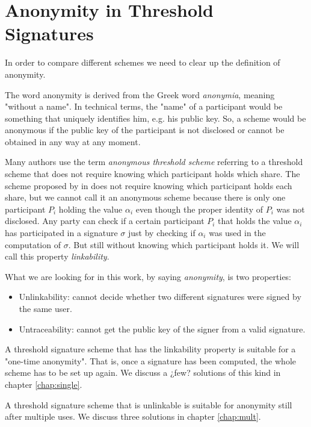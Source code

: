 \chapter{Anonymity in Threshold Signatures}
\label{chap:anon}
In order to compare different schemes we need to clear up the definition of anonymity.

The word anonymity is derived from the Greek word \textit{anonymia}, meaning "without a name". In technical terms, the "name" of a participant would be something that uniquely identifies him, e.g. his public key. So, a scheme would be anonymous if the public key of the participant is not disclosed or cannot be obtained in any way at any moment.

Many authors use the term \textit{anonymous threshold scheme} referring to a threshold scheme that does not require knowing which participant holds which share. The scheme proposed by \citeauthor{Boldyreva03} in \cite{Boldyreva03} does not require knowing which participant holds each share, but we cannot call it an anonymous scheme because there is only one participant $P_i$ holding the value $\alpha_i$ even though the proper identity of $P_i$ was not disclosed. Any party can check if a certain participant $P_i$ that holds the value $\alpha_i$ has participated in a signature $\sigma$ just by checking if $\alpha_i$ was used in the computation of $\sigma$. But still without knowing which participant holds it. We will call this property \textit{linkability}.

What we are looking for in this work, by saying \textit{anonymity}, is two properties:
\begin{itemize}
    \item Unlinkability: cannot decide whether two different signatures were signed by the same user.
    \item Untraceability: cannot get the public key of the signer from a valid signature.
\end{itemize}

A threshold signature scheme that has the linkability property is suitable for a "one-time anonymity". That is, once a signature has been computed, the whole scheme has to be set up again. We discuss a ¿few? solutions of this kind in chapter \ref{chap:single}.

A threshold signature scheme that is unlinkable is suitable for anonymity still after multiple uses. We discuss three solutions in chapter \ref{chap:mult}.
